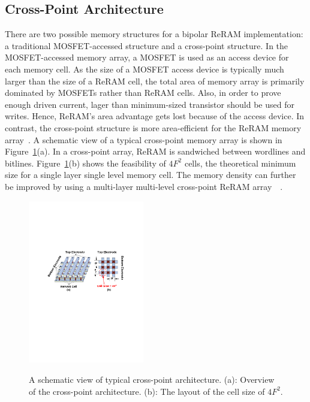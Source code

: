 \subsection{Cross-Point Architecture}
There are two possible memory structures for a bipolar ReRAM
implementation: a traditional MOSFET-accessed structure and a cross-point
structure. In the MOSFET-accessed memory array, a MOSFET is used as an
access device for each memory cell. As the size of a MOSFET access device
is typically much larger than the size of a ReRAM cell, the total area of
memory array is primarily dominated by MOSFETs rather than ReRAM cells.
Also, in order to prove enough driven current, lager than minimum-sized
transistor should be used for writes. Hence, ReRAM's area advantage gets
lost because of the access device.
In contrast, the cross-point structure is more area-efficient for the
ReRAM memory array~\cite{memristor:Cong}. A schematic view of a typical
cross-point memory array is shown in Figure~\ref{fig:array}(a). In a
cross-point array, ReRAM is sandwiched between wordlines and bitlines.
Figure~\ref{fig:array}(b) shows the feasibility of $4F^2$ cells, the
theoretical minimum size for a single layer single level memory cell. The
memory density can further be improved by using a multi-layer multi-level
cross-point ReRAM
array~\cite{ReRAM_Unity}~\cite{memristor:IEDM08_3D}.

\begin{figure}
\centering
  \includegraphics[width=0.45\textwidth]{./figures/crossbar_array2.pdf}\\\vspace{-10pt}
  \caption{A schematic view of typical cross-point architecture. (a): Overview of the cross-point architecture. (b): The layout of the cell size of $4F^2$. }\label{fig:array}
\vspace{-12pt}
\end{figure}

